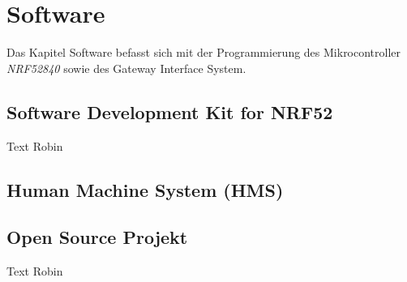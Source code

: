 \clearpage
\section{Software}\label{sec:Software}
Das Kapitel Software befasst sich mit der Programmierung des Mikrocontroller \textit{NRF52840} sowie des Gateway Interface System.

\subsection{Software Development Kit for NRF52}\label{subsec:SDK}
Text Robin

\subsection{Human Machine System (HMS)}\label{subsec:HMS_SW}

\subsection{Open Source Projekt}\label{subsec:OSP}
Text Robin